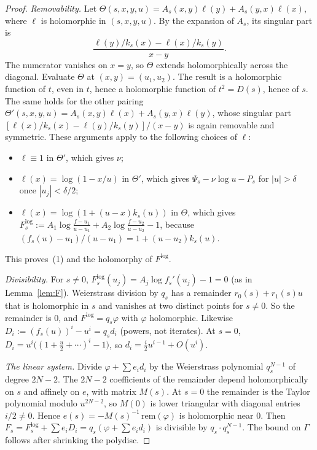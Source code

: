 \documentclass[11pt]{amsart}
\theoremstyle{definition}
\begin{document}
\begin{proof}
\emph{Removability.}  Let $\Theta(s,x,y,u)=A_s(x,y)\ell(y)+A_s(y,x)\ell(x)$,
where $\ell$ is holomorphic in $(s,x,y,u)$.  By the expansion of $A_s$, its
singular part is
\[
 \frac{\ell(y)/k_s(x)-\ell(x)/k_s(y)}{x-y}.
\]
The numerator vanishes on $x=y$, so $\Theta$ extends holomorphically across the
diagonal.  Evaluate $\Theta$ at $(x,y)=(u_1,u_2)$.  The result is a
holomorphic function of $t$, even in $t$, hence a holomorphic function of
$t^2=D(s)$, hence of $s$.  The same holds for the other pairing
$\Theta'(s,x,y,u)=A_s(x,y)\ell(x)+A_s(y,x)\ell(y)$, whose singular part
$[\ell(x)/k_s(x)-\ell(y)/k_s(y)]/(x-y)$ is again removable and symmetric.
These arguments apply to the following choices of $\ell$:
\begin{itemize}
\item $\ell\equiv1$ in $\Theta'$, which gives $\nu$;
\item $\ell(x)=\log(1-x/u)$ in $\Theta'$, which gives $\Psi_s-\nu\log u-P_s$ for
  $|u|>\delta$ once $|u_j|<\delta/2$;
\item $\ell(x)=\log(1+(u-x)k_s(u))$ in $\Theta$, which gives
  $F^{\log}_s:=A_1\log\frac{f-u_1}{u-u_1}+A_2\log\frac{f-u_2}{u-u_2}-1$,
  because $(f_s(u)-u_1)/(u-u_1)=1+(u-u_2)k_s(u)$.
\end{itemize}
This proves~(1) and the holomorphy of $F^{\log}$.

\emph{Divisibility.}  For $s\ne0$, $F^{\log}_s(u_j)=A_j\log f_s'(u_j)-1=0$
(as in Lemma~\ref{lem:F}).  Weierstrass division by $q_s$ has a remainder
$r_0(s)+r_1(s)u$ that is holomorphic in $s$ and vanishes at two distinct points
for $s\ne0$.  So the remainder is $0$, and $F^{\log}=q_s\varphi$ with $\varphi$
holomorphic.  Likewise $D_i:=(f_s(u))^i-u^i=q_s d_i$ (powers, not iterates).  At $s=0$,
$D_i=u^i\bigl((1+\tfrac u2+\cdots)^i-1\bigr)$, so
$d_i=\tfrac i2u^{i-1}+O(u^i)$.

\emph{The linear system.}  Divide $\varphi+\sum e_id_i$ by the Weierstrass
polynomial $q_s^{N-1}$ of degree $2N-2$.  The $2N-2$ coefficients of the
remainder depend holomorphically on $s$ and affinely on $e$, with matrix
$M(s)$.  At $s=0$ the remainder is the Taylor polynomial modulo $u^{2N-2}$, so
$M(0)$ is lower triangular with diagonal entries $i/2\ne0$.  Hence
$e(s)=-M(s)^{-1}\,\mathrm{rem}(\varphi)$ is holomorphic near $0$.  Then
$F_s=F^{\log}_s+\sum e_iD_i=q_s(\varphi+\sum e_id_i)$ is divisible by
$q_s\cdot q_s^{N-1}$.  The bound on $\Gamma$ follows after shrinking the
polydisc.
\end{proof}
\end{document}
